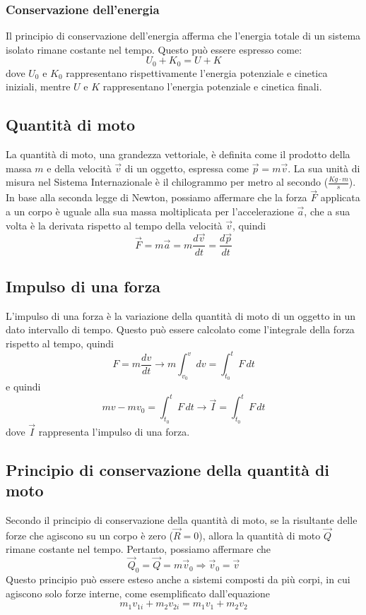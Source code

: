 \documentclass{article}
\begin{document}
\subsubsection{Conservazione dell'energia}
Il principio di conservazione dell'energia afferma che l'energia totale di un sistema isolato rimane costante nel tempo. Questo può essere espresso come:
\[
U_0 + K_0 = U + K
\]
dove \(U_0\) e \(K_0\) rappresentano rispettivamente l'energia potenziale e cinetica iniziali, mentre \(U\) e \(K\) rappresentano l'energia potenziale e cinetica finali.
\newpage




\subsection{Quantità di moto}
La quantità di moto, una grandezza vettoriale, è definita come il prodotto della massa \( m \) e della velocità \( \Vec{v} \) di un oggetto, espressa come \( \Vec{p} = m\Vec{v} \). La sua unità di misura nel Sistema Internazionale è il chilogrammo per metro al secondo (\( \frac{Kg \cdot m}{s} \)). In base alla seconda legge di Newton, possiamo affermare che la forza \( \Vec{F} \) applicata a un corpo è uguale alla sua massa moltiplicata per l'accelerazione \( \Vec{a} \), che a sua volta è la derivata rispetto al tempo della velocità \( \Vec{v} \), quindi
\[
    \Vec{F} = m\Vec{a} = m\frac{d\Vec{v}}{dt} = \frac{d\Vec{p}}{dt}
\]
\subsection{Impulso di una forza}
L'impulso di una forza è la variazione della quantità di moto di un oggetto in un dato intervallo di tempo. Questo può essere calcolato come l'integrale della forza rispetto al tempo, quindi
\[
     F = m\frac{dv}{dt} \rightarrow m \int_{v_0}^{v} dv = \int_{t_0}^{t} F \, dt
\]
e quindi
\[
    mv - mv_0 = \int_{t_0}^{t} F \, dt \rightarrow \Vec{I} = \int_{t_0}^{t} F \, dt
\]
dove \( \Vec{I} \) rappresenta l'impulso di una forza.
\subsection{Principio di conservazione della quantità di moto}
Secondo il principio di conservazione della quantità di moto, se la risultante delle forze che agiscono su un corpo è zero (\( \Vec{R} = 0 \)), allora la quantità di moto \( \Vec{Q} \) rimane costante nel tempo. Pertanto, possiamo affermare che
\[
    \Vec{Q}_0 = \Vec{Q} = m\Vec{v}_0 \Rightarrow \Vec{v}_0 = \Vec{v}
\]
Questo principio può essere esteso anche a sistemi composti da più corpi, in cui agiscono solo forze interne, come esemplificato dall'equazione
\[
    m_1v_{1i} + m_2v_{2i} = m_1v_1 + m_2v_2
\]
\newpage
\end{document}
